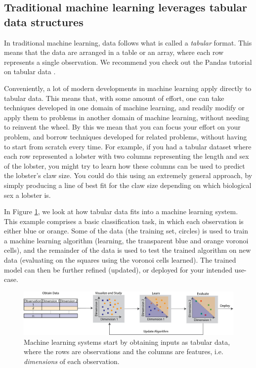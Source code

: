 \subsection{Traditional machine learning leverages tabular data structures}

In traditional machine learning, data follows what is called a \textit{tabular} format. This means that the data are arranged in a table or an array, where each row represents a single observation. We recommend you check out the Pandas tutorial on tabular data \cite{pandastut}. 

Conveniently, a lot of modern developments in machine learning apply directly to tabular data. This means that, with some amount of effort, one can take techniques developed in one domain of machine learning, and readily modify or apply them to problems in another domain of machine learning, without needing to {reinvent the wheel}. By this we mean that you can focus your effort on your problem, and borrow techniques developed for related problems, without having to start from scratch every time. For example, if you had a tabular dataset where each row represented a lobster with two columns representing the length and sex of the lobster, you might try to learn how these columns can be used to predict the lobster's claw size. You could do this using an extremely general approach, by simply producing a line of best fit for the claw size depending on which biological sex a lobster is. 

In Figure \ref{fig:ch1:tabular-dat}, we look at how tabular data fits into a machine learning system. This example comprises a basic classification task, in which each observation is either blue or orange. Some of the data (the {training set}, circles) is used to train a machine learning algorithm ({learning}, the transparent blue and orange voronoi cells), and the remainder of the data is used to test the trained algorithm on new data ({evaluating} on the squares using the voronoi cells learned). The trained model can then be further refined ({updated}), or deployed for your intended use-case.

\begin{figure}[h]
    \centering
    \includegraphics[width=\linewidth]{foundations/ch1/Images/ml_ex.png}
    \caption[Machine learning system]{Machine learning systems start by obtaining inputs as tabular data, where the rows are observations and the columns are features, i.e.  \textit{dimensions} of each observation.}
    \label{fig:ch1:tabular-dat}
\end{figure}

